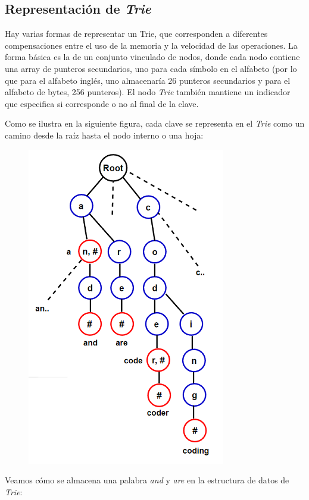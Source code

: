 \subsection{Representación de \emph{Trie}}

Hay varias formas de representar un Trie, que corresponden a diferentes compensaciones entre el uso de la memoria y la velocidad de las operaciones. La forma básica es la de un conjunto vinculado de nodos, donde cada nodo contiene una array de punteros secundarios, uno para cada símbolo en el alfabeto (por lo que para el alfabeto inglés, uno almacenaría 26 punteros secundarios y para el alfabeto de bytes, 256 punteros). El nodo \emph{Trie} también mantiene un indicador que especifica si corresponde o no al final de la clave.

Como se ilustra en la siguiente figura, cada clave se representa en el \emph{Trie} como un camino desde la raíz hasta el nodo interno o una hoja:

\begin{figure}[h!]
	\centering
	\includegraphics[width=0.4\linewidth]{img/Trie}
	\label{fig:trie}
\end{figure}

Veamos cómo se almacena una palabra \emph{and} y \emph{are} en la estructura de datos de \emph{Trie}:

